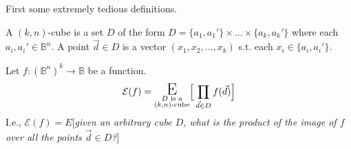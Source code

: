 First some extremely tedious definitions.
\pause
\begin{definition}[$(k, n)$-Cube]
A $(k, n)$-cube is a set $D$ of the form
\(D = \{ a_1, a_1' \} \times ... \times \{ a_k, a_k' \}\)
where each $a_i, a_i' \in \mathbb{B}^n$.
A point $\vec{d} \in D$ is a vector $(x_1, x_2, ..., x_k)$ s.t. each $x_i \in \{ a_i, a_i' \}$.
\end{definition}
\pause
\begin{definition}[$\mathcal{E}$]
Let $f : (\mathbb{B}^n)^k \to \mathbb{B}$ be a function.
\[\mathcal{E}(f) = \underset{\substack{D \text{ is a}\\(k, n)\text{-cube}}}{{\LARGE \text{E}}} \Big[\prod_{\vec{d} \in D} f(\vec{d}) \Big]\]
I.e., $\mathcal{E}(f) = E[$\emph{given an arbitrary cube $D$, what is the product of the image of $f$ over all the points $\vec{d} \in D$?}$]$
\end{definition}